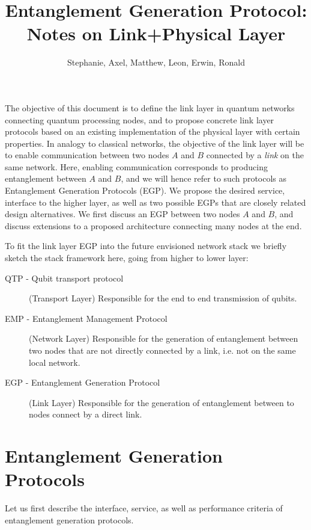 \documentclass{article}
\begin{document}
\title{Entanglement Generation Protocol: Notes on Link+Physical Layer}
\author{Stephanie, Axel, Matthew, Leon, Erwin, Ronald}
\maketitle

The objective of this document is to define the link layer in quantum networks connecting quantum processing nodes, and to propose concrete link layer protocols
based on an existing implementation of the physical layer with certain properties. In analogy to classical networks, the objective of the link layer will be to enable communication between two nodes $A$ and $B$ connected by a \emph{link} on the same network. Here, enabling communication corresponds to producing entanglement between $A$ and $B$, and we will hence refer to such protocols as Entanglement Generation Protocols (EGP).
We propose the desired service, interface to the higher layer, as well as two possible EGPs that are closely related design alternatives. We first discuss an EGP between two nodes $A$ and $B$, and discuss extensions
to a proposed architecture connecting many nodes at the end.

To fit the link layer EGP into the future envisioned network stack we briefly sketch the stack framework here, going from higher to lower layer:
\begin{description}
\item[QTP - Qubit transport protocol] (Transport Layer) Responsible for the end to end transmission of qubits.
\item[EMP - Entanglement Management Protocol] (Network Layer) Responsible for the generation of entanglement between two nodes that are not directly connected by a link, i.e. not on the same local network.
\item[EGP - Entanglement Generation Protocol] (Link Layer) Responsible for the generation of entanglement between to nodes connect by a direct link.
\end{description}

\section{Entanglement Generation Protocols}
Let us first describe the interface, service, as well as performance criteria of entanglement generation protocols.
\end{document}
